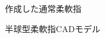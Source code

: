 \begin{figure}[h]
\caption{作成した通常柔軟指}
\label{fig::soft_finger}
\end{figure}

\begin{figure}[h]
\centering

\hspace{5mm}
\caption{半球型柔軟指CADモデル}
\label{fig::sm_cad}
\end{figure}

